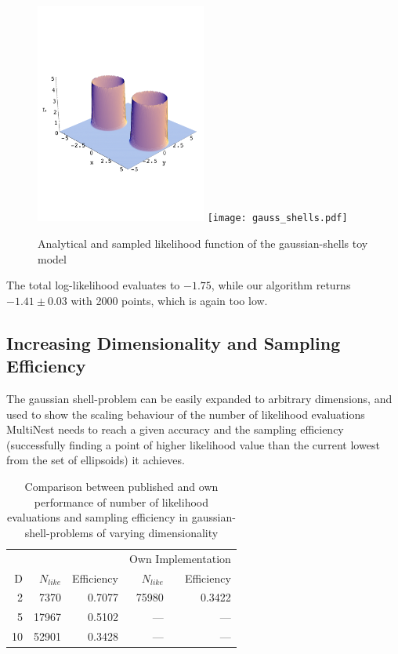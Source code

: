 \documentclass{article}
\begin{document}
\begin{figure}[h]
\includegraphics[width=0.5\textwidth]{gauss_shells_analytic.pdf}
\texttt{[image: gauss\_shells.pdf]}
\caption{Analytical and sampled likelihood function of the gaussian-shells toy model}
\label{gaussshell}
\end{figure}

The total log-likelihood evaluates to $-1.75$, while our algorithm returns $-1.41\pm 0.03$  with 2000 points, which is again too low.

\subsection{Increasing Dimensionality and Sampling Efficiency}
The gaussian shell-problem can be easily expanded to arbitrary dimensions, and used to show the scaling behaviour of the number of likelihood evaluations MultiNest needs to reach a given accuracy and the sampling efficiency (successfully finding a point of higher likelihood value than the current lowest from the set of ellipsoids) it achieves.
\begin{table}\label{tab:NlikeEff}
\centering
\begin{tabular}{rrrrr}
\hline
&\multicolumn{2}{c}{\cite{2009MNRAS.398.1601F}} &\multicolumn{2}{c}{Own Implementation} \\
D&$N_{like}$ & Efficiency & $N_{like}$ & Efficiency \\ \hline
 2 &  7370 & 0.7077 & 75980 & 0.3422 \\
 5 & 17967 & 0.5102 &  ---  &  ---   \\
10 & 52901 & 0.3428 &  ---  &  ---   \\ \hline
\end{tabular}
\caption{Comparison between published and own performance of number of likelihood evaluations and sampling efficiency in gaussian-shell-problems of varying dimensionality}
\end{table}
\end{document}

